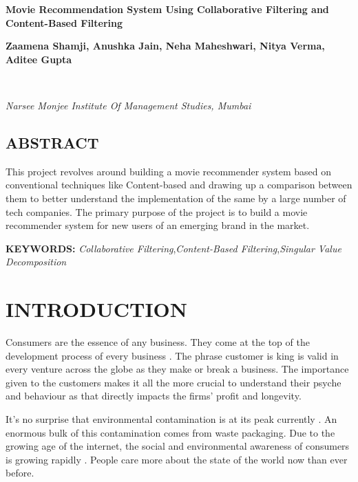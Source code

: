 \documentclass[a4paper,10pt]{article}
\begin{document}
\noindent 
\begin{center}
\textbf{{\Large Movie Recommendation System Using Collaborative Filtering and Content-Based Filtering}} \\
\end{center}

\noindent 
\begin{center}
\textbf{ Zaamena Shamji, Anushka Jain, Neha Maheshwari, Nitya Verma, Aditee Gupta } 
\end{center}\\[-0.5cm]

\begin{center}
\textit{Narsee Monjee Institute Of Management Studies, Mumbai}\\
\end{center}


\noindent 
\begin{center}
    \subsection*{ABSTRACT}
    This project revolves around building a movie recommender system based on conventional techniques like Content-based and drawing up a comparison between them to better understand the implementation of the same by a large number of tech companies. The primary purpose of the project is to build a movie recommender system for new users of an emerging brand in the market.

\end{center}

\noindent 
\textbf{KEYWORDS:} \textit{Collaborative Filtering},\textit{Content-Based Filtering},\textit{Singular Value Decomposition}


\section{INTRODUCTION}

Consumers are the essence of any business. They come at the top of the development process of every business \cite{Witek2020}. The phrase customer is king is valid in every venture across the globe as they make or break a business. The importance given to the customers makes it all the more crucial to understand their psyche and behaviour as that directly impacts the firms' profit and longevity. 

It's no surprise that environmental contamination is at its peak currently \cite{RaviVyas2023}. An enormous bulk of this contamination comes from waste packaging. Due to the growing age of the internet, the social and environmental awareness of consumers is growing rapidly \cite{Groening2018}. People care more about the state of the world now than ever before. 
\end{document}
